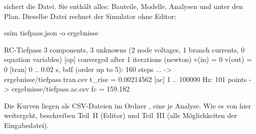  sichert die Datei. Sie enthält alles: Bauteile, Modelle,
Analysen und unter  den Plan. Dieselbe Datei rechnet der
Simulator ohne Editor:

\begin{shell}
esim tiefpass.json -o ergebnisse
\end{shell}

\begin{shell}
RC-Tiefpass
3 components, 3 unknowns (2 node voltages, 1 branch currents, 0 equation variables)
[op] converged after 1 iterations (newton)
  v(in)  = 0
  v(out) = 0
[tran] 0 .. 0.02 s, bdf (order up to 5): 160 steps ... -> ergebnisse/tiefpass.tran.csv
  t_rise = 0.00214562
[ac] 1 .. 100000 Hz: 101 points -> ergebnisse/tiefpass.ac.csv
  fc = 159.182
\end{shell}

Die Kurven liegen als CSV-Dateien im Ordner , eine je
Analyse. Wie es von hier weitergeht, beschreiben Teil~II (Editor) und
Teil~III (alle Möglichkeiten der Eingabedatei).
